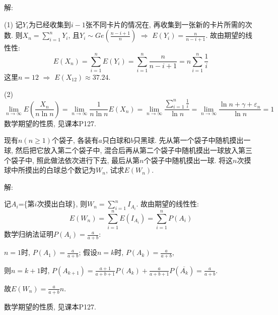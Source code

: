 \documentclass[standard]{ExBook}
\begin{document}
\begin{qitems}
\vspace{-5em}

    \begin{bbox}
解: 

(1) 记$Y_{i}$为已经收集到$i-1$张不同卡片的情况在, 再收集到一张新的卡片所需的次数. 则$X_{n}=\sum\limits_{i=1}^{n}Y_{i}$, 且$Y_{i}\sim Ge(\frac{n-i+1}{n})$ $\Longrightarrow$ $E(Y_{i})=\frac{n}{n-i+1}$. 故由期望的线性性:
$$E(X_{n})=\sum\limits_{i=1}^{n}E(Y_{i})=\sum\limits_{i=1}^{n}\frac{n}{n-i+1}=n\sum\limits_{i=1}^{n}\frac{1}{i}$$
这里$n=12$ $\Longrightarrow$ $E(X_{12})\approx37.24$.

(2) 
$$\lim\limits_{n\to\infty}E\left(\displaystyle\frac{X_n}{n\ln n}\right)=\lim\limits_{n\to\infty}\frac{1}{n\ln n}E(X_n)=\lim\limits_{n\to\infty}\frac{\sum\limits_{i=1}^{n}\frac{1}{i}}{\ln n}=\lim\limits_{n\to\infty}\frac{\ln n+\gamma+\varepsilon_n}{\ln n}=1$$
\textcolor{themeColor}{\selectfont {}
数学期望的性质, 见课本P127.}
    \end{bbox}

\vspace{-5em}

    \begin{bbox}
    \begin{shaded}
        \qitem
现有$n(n\geq 1)$个袋子, 各装有$a$只白球和$b$只黑球. 先从第一个袋子中随机摸出一球, 然后把它放入第二个袋子中, 混合后再从第二个袋子中随机摸出一球放入第三个袋子中, 照此做法依次进行下去, 最后从第$n$个袋子中随机摸出一球. 将这$n$次摸球中所摸出的白球总个数记为$W_n$, 试求$E(W_n)$.
    \end{shaded}
    \end{bbox}

\vspace{-5em}

    \begin{bbox}
解: 

记$A_i$=\{第$i$次摸出白球\}, 则$W_n=\sum\limits_{i=1}^{n}I_{A_{i}}$. 故由期望的线性性:
$$E(W_n)=\sum\limits_{i=1}^{n}E(I_{A_i})=\sum\limits_{i=1}^{n}P(A_{i})$$
数学归纳法证明$P(A_i)=\frac{a}{a+b}$:

$n=1$时, $P(A_1)=\frac{a}{a+b}$; 假设$n=k$时, $P(A_k)=\frac{a}{a+b}$, 

则$n=k+1$时, $P(A_{k+1})=\frac{a+1}{a+b+1}P(A_k)+\frac{a}{a+b+1}P(\overline{A_k})=\frac{a}{a+b}$.

故$E(W_n)=\frac{a}{a+b}n$.

\textcolor{themeColor}{\selectfont {}
数学期望的性质, 见课本P127.}
    \end{bbox}


\end{qitems}
\end{document}

